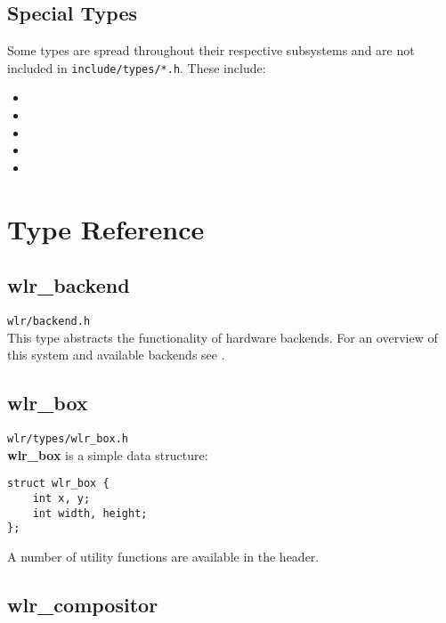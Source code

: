 \documentclass{article}
\newcommand{\code}[1]{\texttt{#1}}
\begin{document}
\subsection{Special Types}\label{special types}

Some types are spread throughout their respective subsystems and are not
included in \code{include/types/*.h}. These include:

\begin{itemize}
    \itemsep0em
    \item {}
    \item {}
    \item {}
    \item {}
    \item {}
\end{itemize}

\newpage
\section{Type Reference}\label{type reference}

\subsection{wlr_backend}\label{wlr backend}

\code{wlr/backend.h}\\

This type abstracts the functionality of hardware backends. For an overview of
this system and available backends see .

\subsection{wlr_box}\label{wlr box}

\code{wlr/types/wlr_box.h}\\

\textbf{wlr_box} is a simple data structure:

\begin{verbatim}
struct wlr_box {
    int x, y;
    int width, height;
};
\end{verbatim}

A number of utility functions are available in the header.

\subsection{wlr_compositor}\label{wlr compositor}
\end{document}
